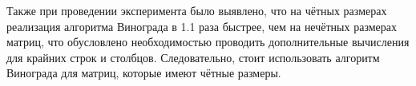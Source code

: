 Также при проведении эксперимента было выявлено, что на чётных размерах реализация алгоритма Винограда в 1.1 раза быстрее, чем на нечётных размерах матриц, что обусловлено необходимостью проводить дополнительные вычисления для крайних строк и столбцов. Следовательно, стоит использовать алгоритм Винограда для матриц, которые имеют чётные размеры.

